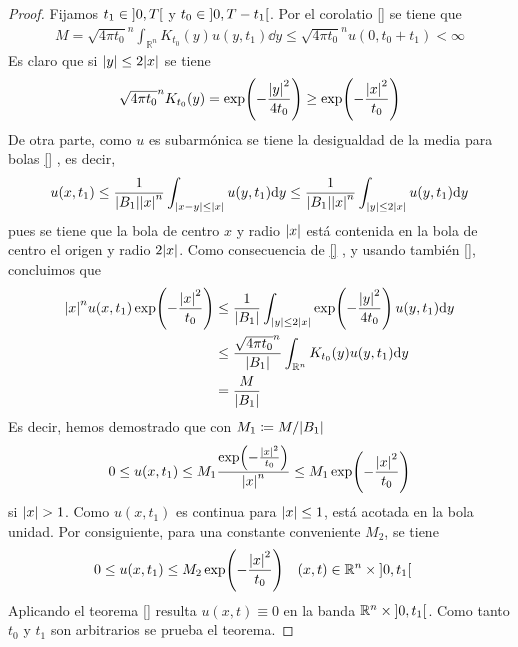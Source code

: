\documentclass{article}
\newcommand{\realNumbers}{\mathbb{R}}
\theoremstyle{definition}
\theoremstyle{remark}
\newcommand{\leftOpenInterval}{\left]}
\newcommand{\rightOpenInterval}{\right[}
\newcommand{\leftClosedInterval}{\left[}
\newcommand{\rightClosedInterval}{\right]}
\newcommand{\interval}[3]{%
  \ifstrequal{#1}{oo}{%
    \leftOpenInterval #2, #3 \rightOpenInterval%
  }{%
    \ifstrequal{#1}{co}{%
      \leftClosedInterval #2, #3 \rightOpenInterval%
    }{%
      \ifstrequal{#1}{oc}{
        \leftOpenInterval #2, #3 \rightClosedInterval%
      }{%
        \ifstrequal{#1}{cc}{
          \leftClosedInterval #2, #3 \rightClosedInterval
        }{%
        }%
      }%
    }%
  }%
}
\begin{document}
\begin{proof}
    Fijamos \(t_1 \in \interval{oo}{0}{T}\) y \(t_0 \in \interval{oo}{0}{T - t_1}\).
    Por el corolatio \ref{}  %
    se tiene que
    \begin{align}
      M
      =
      \sqrt{4 \pi t_0}^n \int_{\realNumbers^n} K_{t_0}(y) u(y, t_1) \dd y
      \leq
      \sqrt{4 \pi t_0}^n u(0, t_0 + t_1)
      <
      \infty
    \end{align}
    Es claro que si \(\abs{y} \leq 2 \abs{x}\) se tiene
    \begin{align}
      \sqrt{4 \pi t_0}^n K_{t_0}(y)
      =
      \exp\!\left(- \frac{\abs{y}^2}{4 t_0}\right)
      \geq
      \exp\!\left(- \frac{\abs{x}^2}{t_0}\right)
    \end{align}
    De otra parte, como \(u\) es subarmónica se tiene la desigualdad de la media para bolas \ref{}  %
    , es decir,
    \begin{align}
      u(x, t_1)
      \leq
      \frac{1}{\abs{B_1} \abs{x}^n} \int_{\abs{x - y} \leq \abs{x}} u(y, t_1) \dd y
      \leq
      \frac{1}{\abs{B_1} \abs{x}^n} \int_{\abs{y} \leq 2 \abs{x}} u(y, t_1) \dd y
    \end{align}
    pues se tiene que la bola de centro \(x\) y radio \(\abs{x}\) está contenida en la bola de centro el origen y radio \(2 \abs{x}\).
    Como consecuencia de \ref{}  %
    , y usando también \ref{},  %
    concluimos que
    \begin{align}
      \abs{x}^n u(x, t_1) \exp\!\left(- \frac{\abs{x}^2}{t_0}\right)
      &\leq
      \frac{1}{\abs{B_1}} \int_{\abs{y} \leq 2 \abs{x}} 
        \exp\!\left(- \frac{\abs{y}^2}{4 t_0}\right) u(y, t_1)
      \dd y
      \\
      &\leq
      \frac{\sqrt{4 \pi t_0}^n}{\abs{B_1}} \int_{\realNumbers^n} 
        K_{t_0}(y) u(y, t_1)
      \dd y
      \\
      &=
      \frac{M}{\abs{B_1}}
    \end{align}
    Es decir, hemos demostrado que con \(M_1 \coloneq M / \abs{B_1}\)
    \begin{align}
      0
      \leq
      u(x, t_1)
      \leq
      M_1 \frac{\exp\!\left(- \frac{\abs{x}^2}{t_0}\right)}{\abs{x}^n}
      \leq
      M_1 \exp\!\left(- \frac{\abs{x}^2}{t_0}\right)
    \end{align}
    si \(\abs{x} > 1\).
    Como \(u(x, t_1)\) es continua para \(\abs{x} \leq 1\), está acotada en la bola unidad.
    Por consiguiente, para una constante conveniente \(M_2\), se tiene
    \begin{align}
      &0
      \leq
      u(x, t_1)
      \leq
      M_2 \exp\!\left(- \frac{\abs{x}^2}{t_0}\right)
      && (x, t) \in \realNumbers^n \times \interval{oo}{0}{t_1}
    \end{align}
    Aplicando el teorema \ref{}  %
    resulta \(u(x, t) \equiv 0\) en la banda \(\realNumbers^n \times \interval{oo}{0}{t_1}\).
    Como tanto \(t_0\) y \(t_1\) son arbitrarios se prueba el teorema.
  \end{proof}
\end{document}
